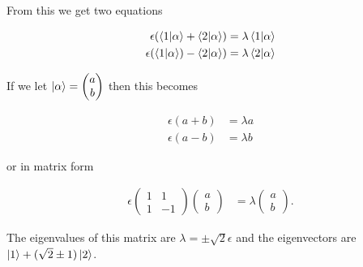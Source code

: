 \documentclass{article}
\begin{document}
From this we get two equations

\begin{align*}
  \epsilon (\braket{1 | \alpha} + \braket{2 | \alpha})  & = \lambda \braket{1 | \alpha} \\
  \epsilon (\braket{1 | \alpha}) - \braket{2 | \alpha}) & = \lambda \braket{2 | \alpha}
\end{align*}

If we let $\ket{\alpha} = \begin{pmatrix}
    a \\
    b
  \end{pmatrix}$ then this becomes

\begin{align*}
  \epsilon (a + b) & = \lambda a \\
  \epsilon (a - b) & = \lambda b
\end{align*}

or in matrix form

\begin{align*}
  \epsilon \begin{pmatrix}
             1 & 1  \\
             1 & -1
           \end{pmatrix} \begin{pmatrix}
                           a \\
                           b
                         \end{pmatrix} & = \lambda \begin{pmatrix}
                                                     a \\
                                                     b
                                                   \end{pmatrix}.
\end{align*}

The eigenvalues of this matrix are $\lambda = \pm \sqrt{2} \epsilon$ and the eigenvectors are $\ket{1} + (\sqrt{2} \pm 1) \ket{2}$.

\subsection{}
\end{document}
